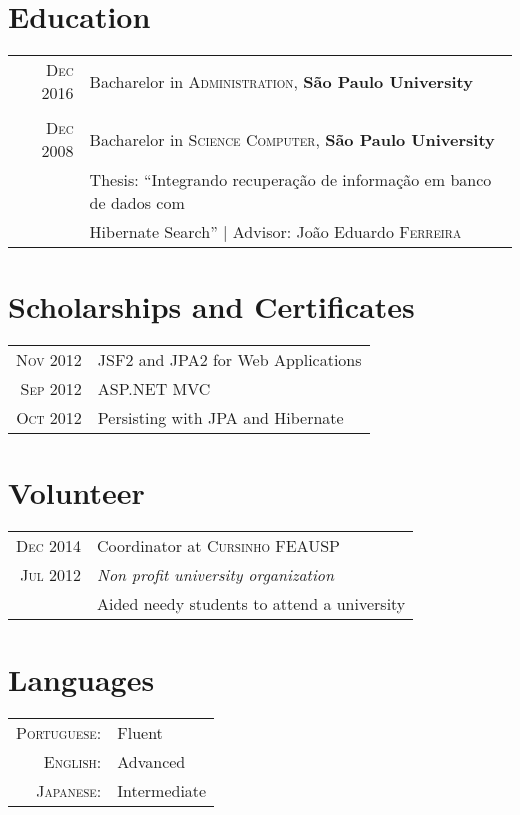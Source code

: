\documentclass[a4paper,10pt]{article}
\begin{document}
\section{Education}
\begin{tabular}{rl} 
 \textsc{Dec} 2016 & Bacharelor in \textsc{Administration}, \textbf{São Paulo University}\\
&\\
\textsc{Dec} 2008& Bacharelor in \textsc{Science Computer}, \textbf{São Paulo University}\\
& Thesis: ``Integrando recuperação de informação em banco de dados com \\
& Hibernate Search'' | \small Advisor: João Eduardo \textsc{Ferreira}\\
\end{tabular}

\section{Scholarships and Certificates}
\begin{tabular}{rl}
 \textsc{Nov} 2012 & JSF2 and JPA2 for Web Applications\\
\textsc{Sep} 2012 & ASP.NET MVC\\
\textsc{Oct} 2012 & Persisting with JPA and Hibernate\\
\end{tabular}

\section{Volunteer}
\begin{tabular}{r|p{11cm}}
  \textsc{Dec} 2014 & Coordinator at \textsc{Cursinho FEAUSP} \\\textsc{Jul 2012}&\emph{Non profit university organization}\\&\footnotesize{
 Aided needy students to attend a university
 }

\end{tabular}

\section{Languages}
\begin{tabular}{rl}
 \textsc{Portuguese:}&Fluent\\
\textsc{English:}&Advanced\\
\textsc{Japanese:}&Intermediate\\
\end{tabular}
\end{document}
